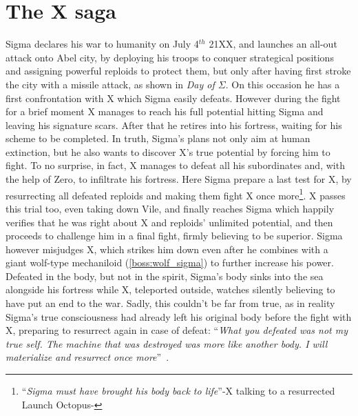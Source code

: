 \section{The X saga}
Sigma declares his war to humanity on July 4$^{th}$ 21XX, and launches an all-out attack onto Abel city, by deploying his troops to conquer strategical positions and assigning powerful reploids to protect them, but only after having first stroke the city  with a missile attack, as shown in \textit{Day of $\Sigma$}. On this occasion he has a first confrontation with X which Sigma easily defeats. However during the fight for a brief moment X manages to reach his full potential hitting Sigma and leaving his signature scars. After that he retires
into his fortress, waiting for his scheme to be completed. In truth, Sigma's plans not only aim at human extinction, but he also wants to discover X's true potential by forcing him to fight. To no surprise, in fact, X manages to defeat all his subordinates and, with the help of Zero, to infiltrate his fortress. Here Sigma prepare a last test for X, by resurrecting all defeated reploids and making them fight X once more\footnote{``\textit{Sigma must have brought his body back to life}''-X talking to a resurrected Launch Octopus-\cite{wiki:MM_MHX_script}}. X passes this trial too, even taking down Vile, and finally reaches Sigma which happily verifies that he was right about X and reploids' unlimited potential, and then proceeds to challenge him in a final fight, firmly believing to be superior. Sigma however misjudges X, which strikes him down even after he combines with a giant wolf-type mechaniloid (\ref{boss:wolf_sigma}) to further increase his power. Defeated in the body, but not in the spirit, Sigma's body sinks into the sea alongside his fortress while X, teleported outside, watches silently believing to have put an end to the war. Sadly, this couldn't be far from true, as in reality Sigma's true consciousness had already left his original body before the fight with X, preparing to resurrect again in case of defeat: ``\textit{What you defeated was not my true self. The machine that was destroyed was more like another body. I will materialize and resurrect once more}''~\cite{wordpress:X_japanese_script}.

